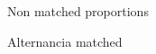 \documentclass{article}
\begin{document}
\begin{figure}[H]
  \caption{Non matched proportions}
  \noindent{}
  \centering
\end{figure}

\begin{figure}[H]
  \caption{Alternancia matched}
  \noindent{}
  \centering
\end{figure}
\end{document}
